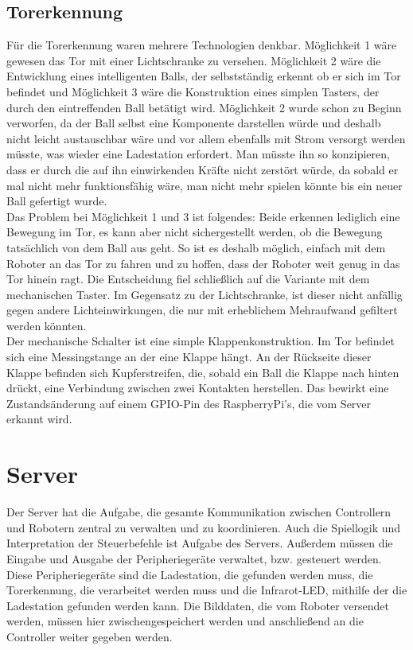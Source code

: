\subsection{Torerkennung}
Für die Torerkennung waren mehrere Technologien denkbar. Möglichkeit 1 wäre gewesen das Tor mit einer Lichtschranke zu versehen. Möglichkeit 2 wäre die Entwicklung eines intelligenten Balls, der selbstständig erkennt ob er sich im Tor befindet und Möglichkeit 3 wäre die Konstruktion eines simplen Tasters, der durch den eintreffenden Ball betätigt wird.
Möglichkeit 2 wurde schon zu Beginn verworfen, da der Ball selbst eine Komponente darstellen würde und deshalb nicht leicht austauschbar wäre und vor allem ebenfalls mit Strom versorgt werden müsste, was wieder eine Ladestation erfordert. Man müsste ihn so konzipieren, dass er durch die auf ihn einwirkenden Kräfte nicht zerstört würde, da sobald er mal nicht mehr funktionsfähig wäre, man nicht mehr spielen könnte bis ein neuer Ball gefertigt wurde. \\
Das Problem bei Möglichkeit 1 und 3 ist folgendes: Beide erkennen lediglich eine Bewegung im Tor, es kann aber nicht sichergestellt werden, ob die Bewegung tatsächlich von dem Ball aus geht. So ist es deshalb möglich, einfach mit dem Roboter an das Tor zu fahren und zu hoffen, dass der Roboter weit genug in das Tor hinein ragt. Die Entscheidung fiel schließlich auf die Variante mit dem mechanischen Taster. Im Gegensatz zu der Lichtschranke, ist dieser nicht anfällig gegen andere Lichteinwirkungen, die nur mit erheblichem Mehraufwand gefiltert werden könnten. \\
Der mechanische Schalter ist eine simple \glqq Klappenkonstruktion\grqq. Im Tor befindet sich eine Messingstange an der eine Klappe hängt. An der Rückseite dieser Klappe befinden sich Kupferstreifen, die, sobald ein Ball die Klappe nach hinten drückt, eine Verbindung zwischen zwei Kontakten herstellen. Das bewirkt eine Zustandsänderung auf einem GPIO-Pin des RaspberryPi's, die vom Server erkannt wird.

\section{Server}
\label{impl:server}
Der Server hat die Aufgabe, die gesamte Kommunikation zwischen Controllern und Robotern zentral zu verwalten und zu koordinieren. Auch die Spiellogik und Interpretation der Steuerbefehle ist Aufgabe des Servers. Außerdem müssen die Eingabe und Ausgabe der Peripheriegeräte verwaltet, bzw. gesteuert werden. Diese Peripheriegeräte sind die Ladestation, die gefunden werden muss, die Torerkennung, die verarbeitet werden muss und die Infrarot-LED, mithilfe der die Ladestation gefunden werden kann. Die Bilddaten, die vom Roboter versendet werden, müssen hier zwischengespeichert werden und anschließend an die Controller weiter gegeben werden.

